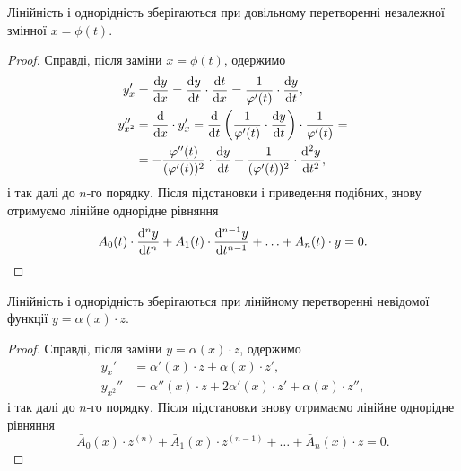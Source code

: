 \begin{theorem}
	Лінійність і однорідність зберігаються при довільному перетворенні незалежної змінної $x = \phi(t)$.
\end{theorem}
\begin{proof}
	Справді, після заміни $x = \phi(t)$, одержимо
	\begin{align}
		\label{eq:3.1.1}
		y_x' &= \frac{\diff y}{\diff x} = \frac{\diff y}{\diff t} \cdot \frac{\diff t}{\diff x} = \frac{1}{\phi'(t)} \cdot \frac{\diff y}{\diff t}, \\
		\label{eq:3.1.2}
		y_{x^2}'' &= \frac{\diff}{\diff x} \cdot y_x' = \frac{\diff}{\diff t} \left( \frac{1}{\phi'(t)} \cdot \frac{\diff y}{\diff t} \right) \cdot \frac{1}{\phi'(t)} = \\
		&= - \frac{\phi''(t)}{(\phi'(t))^2} \cdot \frac{\diff y}{\diff t} + \frac{1}{(\phi'(t))^2} \cdot \frac{\diff^2 y}{\diff t^2}, \nonumber
	\end{align}
	і так далі до $n$-го порядку. Після підстановки і приведення подібних, знову отримуємо лінійне однорідне рівняння
	\begin{equation}
		\label{eq:3.1.3}
		A_0(t) \cdot \frac{\mathop{}\!\mathrm{d}^n y}{\mathop{}\!\mathrm{d} t^n} + A_1(t) \cdot \frac{\mathop{}\!\mathrm{d}^{n - 1} y}{\mathop{}\!\mathrm{d} t^{n - 1}} + \ldots + A_n(t) \cdot y = 0.
	\end{equation}
\end{proof}

\begin{theorem}
	Лінійність і однорідність зберігаються при лінійному перетворенні невідомої функції $y = \alpha (x) \cdot z$.
\end{theorem}
\begin{proof}
	Справді, після заміни $y = \alpha (x) \cdot z$, одержимо
	\begin{align}
		\label{eq:3.1.4}
		y_x' &= \alpha'(x) \cdot z + \alpha(x) \cdot z', \\
		\label{eq:3.1.5}
		y_{x^2}'' &= \alpha''(x) \cdot z + 2 \alpha'(x) \cdot z' + \alpha(x) \cdot z'',
	\end{align}
	і так далі до $n$-го порядку. Після підстановки знову отримаємо лінійне однорідне рівняння
	\begin{equation}
		\label{eq:3.1.6}
		\bar A_0(x) \cdot z^{(n)} + \bar A_1(x) \cdot z^{(n - 1)} + \ldots + \bar A_n(x) \cdot z = 0.
	\end{equation}
\end{proof}